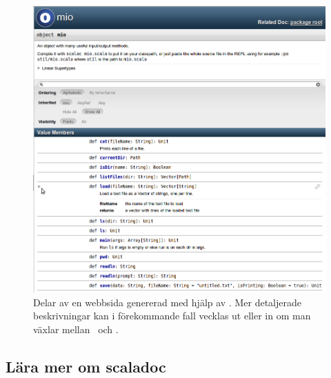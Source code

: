 \begin{figure}[T]
\includegraphics[width=1.0\textwidth]{../img/scaladoc/scaladoc-mio}
    \caption{Delar av en webbsida genererad med hjälp av \scaladoc. Mer detaljerade beskrivningar kan i förekommande fall vecklas ut eller in om man växlar mellan \Forward~och \MoveDown.}
    \label{fig:scaladoc:webpage}
\end{figure}


\subsection{Lära mer om scaladoc}

